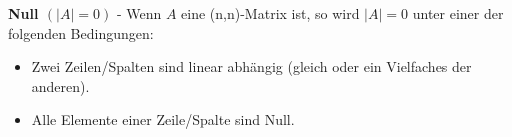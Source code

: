 % 	
	\textbf{Null $(|A| = 0)$} - Wenn $A$ eine (n,n)-Matrix ist, so wird $|A| = 0$ unter einer der
	folgenden Bedingungen:
	\begin{itemize}
    	\item Zwei Zeilen/Spalten sind linear abhängig (gleich oder ein Vielfaches der anderen).
    	\item Alle Elemente einer Zeile/Spalte sind Null. \\
  	\end{itemize} 
	
% 	
% 	
